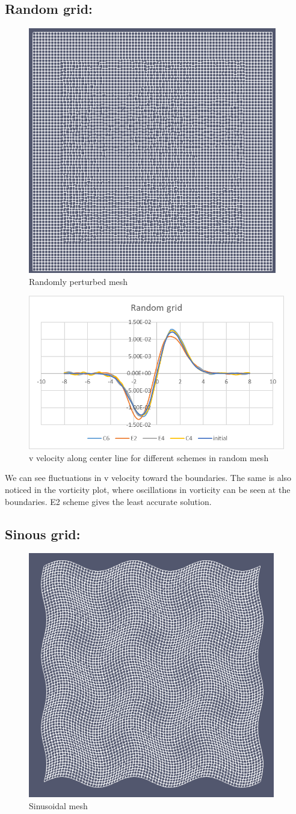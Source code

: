 \documentclass{hcmut-report}
\begin{document}
    \subsection{Random grid: }

    \begin{figure}[H]
        \centering
        \includegraphics[width=0.4\linewidth]{graphics/Rgrid.png}
        \caption{Randomly perturbed mesh}
        \label{fig:my_label}
    \end{figure}

    \begin{figure}[H]
        \centering
        \includegraphics[width=0.6\linewidth]{graphics/random.png}
        \caption{v velocity along center line for different schemes in random mesh}
        \label{fig:my_label}
    \end{figure}

    We can see fluctuations in v velocity toward the boundaries. The same is also noticed in the vorticity plot, where oscillations in vorticity can be seen at the boundaries. E2 scheme gives the least accurate solution.

    \subsection{Sinous grid: }

    \begin{figure}[H]
        \centering
        \includegraphics[width=0.4\linewidth]{graphics/Sgrid.png}
        \caption{Sinusoidal mesh}
        \label{fig:my_label}
    \end{figure}
\end{document}
